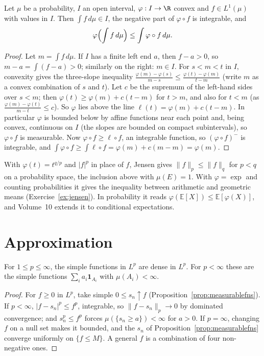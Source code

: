 \begin{theorem}\label{thm:jensen}
Let $\mu$ be a probability, $I$ an open interval, $\varphi:I\to\R$ convex and $f\in L^1(\mu)$ with values in $I$. Then $\int f\,d\mu\in I$, the negative part of $\varphi\circ f$ is integrable, and
\[\varphi\Bigl(\int f\,d\mu\Bigr)\le\int\varphi\circ f\,d\mu.\]
\end{theorem}
\begin{proof}
Let $m=\int f\,d\mu$. If $I$ has a finite left end $a$, then $f-a>0$, so $m-a=\int(f-a)>0$; similarly on the right: $m\in I$. For $s<m<t$ in $I$, convexity gives the three-slope inequality
$\frac{\varphi(m)-\varphi(s)}{m-s}\le\frac{\varphi(t)-\varphi(m)}{t-m}$ (write $m$ as a convex combination of $s$ and $t$). Let $c$ be the supremum of the left-hand sides over $s<m$; then
$\varphi(t)\ge\varphi(m)+c(t-m)$ for $t>m$, and also for $t<m$ (as $\frac{\varphi(m)-\varphi(t)}{m-t}\le c$). So $\varphi$ lies above the line $\ell(t)=\varphi(m)+c(t-m)$. In particular $\varphi$ is bounded below by
affine functions near each point and, being convex, continuous on $I$ (the slopes are bounded on compact subintervals), so $\varphi\circ f$ is measurable. Now $\varphi\circ f\ge\ell\circ f$, an integrable function, so
$(\varphi\circ f)^-$ is integrable, and $\int\varphi\circ f\ge\int\ell\circ f=\varphi(m)+c(m-m)=\varphi(m)$.
\end{proof}

With $\varphi(t)=t^{q/p}$ and $|f|^p$ in place of $f$, Jensen gives $\|f\|_p\le\|f\|_q$ for $p<q$ on a probability space, the inclusion above with $\mu(E)=1$. With $\varphi=\exp$ and counting
probabilities it gives the inequality between arithmetic and geometric means (Exercise~\ref{ex:jensen}). In probability it reads $\varphi(\mathbb E[X])\le\mathbb E[\varphi(X)]$, and Volume~10 extends it to conditional expectations.

\section{Approximation}

\begin{proposition}\label{prop:simpledense}
For $1\le p\le\infty$, the simple functions in $L^p$ are dense in $L^p$. For $p<\infty$ these are the simple functions $\sum_ia_i\mathbf 1_{A_i}$ with $\mu(A_i)<\infty$.
\end{proposition}
\begin{proof}
For $f\ge0$ in $L^p$, take simple $0\le s_n\uparrow f$ (Proposition~\ref{prop:measurablefns}). If $p<\infty$, $|f-s_n|^p\le f^p$, integrable, so $\|f-s_n\|_p\to0$ by dominated convergence; and $s_n^p\le f^p$ forces
$\mu(\{s_n\ge a\})<\infty$ for $a>0$. If $p=\infty$, changing $f$ on a null set makes it bounded, and the $s_n$ of Proposition~\ref{prop:measurablefns} converge uniformly on $\{f\le M\}$. A general $f$ is a combination
of four non-negative ones.
\end{proof}


